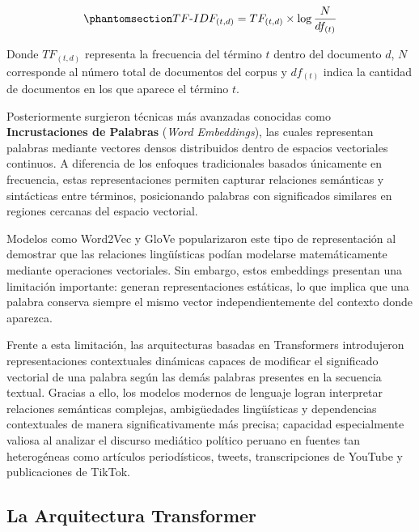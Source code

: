 \begin{equation}\label{eq:tfidf_llm}
\phantomsection
TF\text{-}IDF_{(t,d)} = TF_{(t,d)} \times \log\frac{N}{df_{(t)}}
\end{equation}

Donde $TF_{(t,d)}$ representa la frecuencia del término $t$ dentro del documento $d$, $N$ corresponde al número total de documentos del corpus y $df_{(t)}$ indica la cantidad de documentos en los que aparece el término $t$.

Posteriormente surgieron técnicas más avanzadas conocidas como \textbf{Incrustaciones de Palabras} (\textit{Word Embeddings}), las cuales representan palabras mediante vectores densos distribuidos dentro de espacios vectoriales continuos. A diferencia de los enfoques tradicionales basados únicamente en frecuencia, estas representaciones permiten capturar relaciones semánticas y sintácticas entre términos, posicionando palabras con significados similares en regiones cercanas del espacio vectorial.

Modelos como Word2Vec \parencite{tec_mikolov2013word2vec} y GloVe \parencite{gl_pennington2014glove} popularizaron este tipo de representación al demostrar que las relaciones lingüísticas podían modelarse matemáticamente mediante operaciones vectoriales. Sin embargo, estos embeddings presentan una limitación importante: generan representaciones estáticas, lo que implica que una palabra conserva siempre el mismo vector independientemente del contexto donde aparezca.

Frente a esta limitación, las arquitecturas basadas en Transformers introdujeron representaciones contextuales dinámicas capaces de modificar el significado vectorial de una palabra según las demás palabras presentes en la secuencia textual. Gracias a ello, los modelos modernos de lenguaje logran interpretar relaciones semánticas complejas, ambigüedades lingüísticas y dependencias contextuales de manera significativamente más precisa; capacidad especialmente valiosa al analizar el discurso mediático político peruano en fuentes tan heterogéneas como artículos periodísticos, tweets, transcripciones de YouTube y publicaciones de TikTok.

\subsection{La Arquitectura Transformer}

